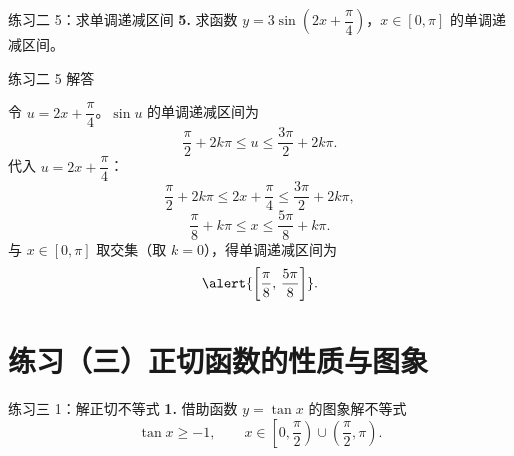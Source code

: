 \documentclass[10pt,aspectratio=169,serif]{beamer}
\begin{document}
\begin{frame}[t]{练习二 5：求单调递减区间}
\textbf{5.} 求函数 $y=3\sin\!\left(2x+\dfrac{\pi}{4}\right)$，$x\in[0,\pi]$ 的单调递减区间。
\end{frame}

\begin{frame}[t]{练习二 5 解答}
\begin{tcolorbox}[colback=orange!10,colframe=orange,title=\textbf{解}]
令 $u=2x+\dfrac{\pi}{4}$。$\sin u$ 的单调递减区间为
\[
\frac{\pi}{2}+2k\pi\le u\le \frac{3\pi}{2}+2k\pi.
\]
代入 $u=2x+\dfrac{\pi}{4}$：
\[
\frac{\pi}{2}+2k\pi\le 2x+\frac{\pi}{4}\le\frac{3\pi}{2}+2k\pi,
\]
\[
\frac{\pi}{8}+k\pi\le x\le\frac{5\pi}{8}+k\pi.
\]
与 $x\in[0,\pi]$ 取交集（取 $k=0$），得单调递减区间为
\[
\alert{\left[\frac{\pi}{8},\,\frac{5\pi}{8}\right]}.
\]
\end{tcolorbox}
\end{frame}

\section*{练习（三）正切函数的性质与图象}

\begin{frame}[t]{练习三 1：解正切不等式}
\textbf{1.} 借助函数 $y=\tan x$ 的图象解不等式
\[
\tan x\ge -1,\qquad x\in\left[0,\frac{\pi}{2}\right)\cup\left(\frac{\pi}{2},\pi\right).
\]
\end{frame}
\end{document}
